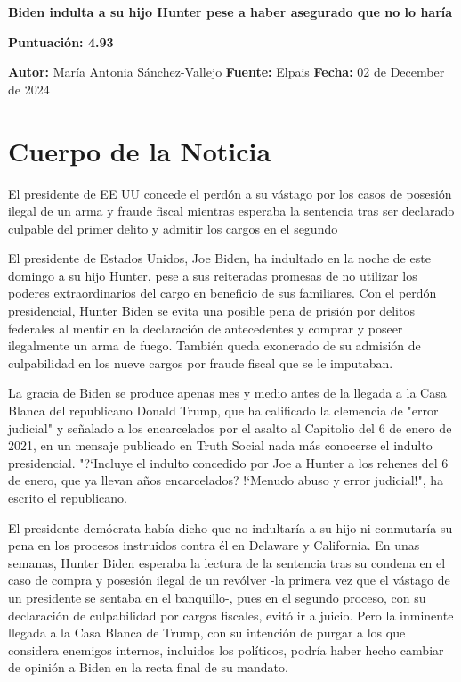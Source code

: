 \documentclass[10pt,a4paper]{article}
\begin{document}
\begin{center}
    {\Huge\bfseries Biden indulta a su hijo Hunter pese a haber asegurado que no lo har\'{i}a\par}
    \vspace{0.5em}
    {\large\bfseries Puntuación: 4.93\par}
\end{center}
\vspace{1em}

\noindent\textbf{Autor:} Mar\'{i}a Antonia S\'{a}nchez-Vallejo \hfill \textbf{Fuente:} Elpais \hfill \textbf{Fecha:} 02 de December de 2024\par
\vspace{1em}

\section*{Cuerpo de la Noticia}
\setlength{\parskip}{1em}
\setlength{\parindent}{0em}
El presidente de EE UU concede el perd\'{o}n a su v\'{a}stago por los casos de posesi\'{o}n ilegal de un arma y fraude fiscal mientras esperaba la sentencia tras ser declarado culpable del primer delito y admitir los cargos en el segundo
\par\medskip
El presidente de Estados Unidos, Joe Biden, ha indultado en la noche de este domingo a su hijo Hunter, pese a sus reiteradas promesas de no utilizar los poderes extraordinarios del cargo en beneficio de sus familiares. Con el perd\'{o}n presidencial, Hunter Biden se evita una posible pena de prisi\'{o}n por delitos federales al mentir en la declaraci\'{o}n de antecedentes y comprar y poseer ilegalmente un arma de fuego. Tambi\'{e}n queda exonerado de su admisi\'{o}n de culpabilidad en los nueve cargos por fraude fiscal que se le imputaban.
\par\medskip
La gracia de Biden se produce apenas mes y medio antes de la llegada a la Casa Blanca del republicano Donald Trump, que ha calificado la clemencia de "error judicial" y se\~{n}alado a los encarcelados por el asalto al Capitolio del 6 de enero de 2021, en un mensaje publicado en Truth Social nada m\'{a}s conocerse el indulto presidencial. "?`Incluye el indulto concedido por Joe a Hunter a los rehenes del 6 de enero, que ya llevan a\~{n}os encarcelados? !`Menudo abuso y error judicial!", ha escrito el republicano.
\par\medskip
El presidente dem\'{o}crata hab\'{i}a dicho que no indultar\'{i}a a su hijo ni conmutar\'{i}a su pena en los procesos instruidos contra \'{e}l en Delaware y California. En unas semanas, Hunter Biden esperaba la lectura de la sentencia tras su condena en el caso de compra y posesi\'{o}n ilegal de un rev\'{o}lver -la primera vez que el v\'{a}stago de un presidente se sentaba en el banquillo-, pues en el segundo proceso, con su declaraci\'{o}n de culpabilidad por cargos fiscales, evit\'{o} ir a juicio. Pero la inminente llegada a la Casa Blanca de Trump, con su intenci\'{o}n de purgar a los que considera enemigos internos, incluidos los pol\'{i}ticos, podr\'{i}a haber hecho cambiar de opini\'{o}n a Biden en la recta final de su mandato.
\end{document}
